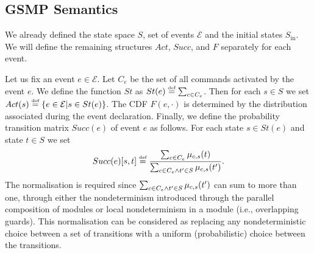 \documentclass{article}
\newcommand{\eqdef}{\ensuremath{\stackrel{\text{\tiny def}}{=}}}
\newcommand{\calE}{\mathcal{E}}
\renewcommand{\_}{\underline{~}}
\newcommand{\events}{{\calE}}
\newcommand{\suc}{Succ}
\newcommand{\initstates}{S_\mathrm{in}}
\newcommand{\act}{Act}
\begin{document}
\subsection*{GSMP Semantics}
We already defined the state space $S$, set of events $\events$ and the initial states $\initstates$. 
We will define the remaining structures $\act$, $\suc$, and $F$ separately for each event.

Let us fix an event $e \in \events$. 
Let $C_e$ be the set of all commands activated by the event $e$.
We define the function $St$ as $St(e) \eqdef \sum_{c \in C_e}$.
Then for each $s \in S$ we set $\act(s) \eqdef \{e \in \events | s \in St(e) \}$.
The CDF $F(e,\cdot)$ is determined by the distribution associated during the event declaration. 
Finally, we define the probability transition matrix  $\suc(e)$ of event $e$ as follows. 
For each state $s\in St(e)$ and state $t \in S$ we set
\[\suc(e)[s,t] \eqdef \frac{\sum_{c \in C_e} \mu_{c,s}(t)}{\sum_{c \in C_e \\ \wedge t'\in S} \mu_{c,s}(t')}. \]
%
%
The normalisation is required since $\sum_{c \in C_e \\ \wedge t'\in S} \mu_{c,s}(t')$ can sum to more than one, through either the nondeterminism introduced through the parallel composition of modules or local nondeterminism in a module (i.e., overlapping guards). 
This normalisation can be considered as replacing any nondeterministic choice between a set of transitions with a uniform (probabilistic) choice between the transitions.
\end{document}
